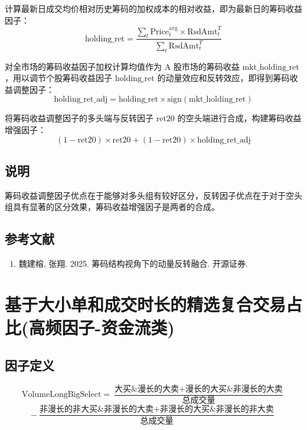 \documentclass{article}
\begin{document}
计算最新日成交均价相对历史筹码的加权成本的相对收益，即为最新日的筹码收益因子：
\begin{equation}
    \mathrm{holding\_ret} = \frac{\sum_t \mathrm{Price}_t^{\mathrm{avg}} \times \mathrm{RsdAmt}_t^T}{\sum_t \mathrm{RsdAmt}_t^T}
\end{equation}

对全市场的筹码收益因子加权计算均值作为 A 股市场的筹码收益 \( \mathrm{mkt\_holding\_ret} \)，用以调节个股筹码收益因子 \( \mathrm{holding\_ret} \) 的动量效应和反转效应，即得到筹码收益调整因子：
\begin{equation}
    \mathrm{holding\_ret\_adj} = \mathrm{holding\_ret} \times \mathrm{sign}(\mathrm{mkt\_holding\_ret})
\end{equation}

将筹码收益调整因子的多头端与反转因子 \( \mathrm{ret20} \) 的空头端进行合成，构建筹码收益增强因子：
\begin{equation}
     (1 - \mathrm{ret20}) \times \mathrm{ret20} + (1 - \mathrm{ret20}) \times \mathrm{holding\_ret\_adj}
\end{equation}

\subsection{说明}
筹码收益调整因子优点在于能够对多头组有较好区分，反转因子优点在于对于空头组具有显著的区分效果，筹码收益增强因子是两者的合成。

\subsection{参考文献}
\begin{enumerate}
    \item 魏建榕, 张翔. 2025. 筹码结构视角下的动量反转融合. 开源证券.
\end{enumerate}

\section{基于大小单和成交时长的精选复合交易占比(高频因子-资金流类)}

\subsection{因子定义}
\begin{equation}
    \mathrm{VolumeLongBigSelect} = \frac{\text{大买\&漫长的大卖} + \text{漫长的大买\&非漫长的大卖}}{\text{总成交量}} 
\end{equation}   
\begin{equation}
    - \frac{\text{非漫长的非大买\&非漫长的大卖} + \text{非漫长的大买\&非漫长的非大卖}}{\text{总成交量}}
\end{equation}
\end{document}
